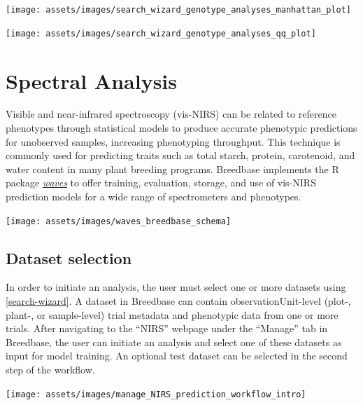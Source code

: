 \documentclass[
  12pt,
]{book}
\begin{document}
\begin{center}\texttt{[image: assets/images/search\_wizard\_genotype\_analyses\_manhattan\_plot]} \end{center}

\begin{center}\texttt{[image: assets/images/search\_wizard\_genotype\_analyses\_qq\_plot]} \end{center}

\hypertarget{spectral-analysis}{%
\section{Spectral Analysis}\label{spectral-analysis}}

Visible and near-infrared spectroscopy (vis-NIRS) can be related to reference phenotypes through statistical models to produce accurate phenotypic predictions for unobserved samples, increasing phenotyping throughput. This technique is commonly used for predicting traits such as total starch, protein, carotenoid, and water content in many plant breeding programs. Breedbase implements the R package \href{https://CRAN.R-project.org/package=waves}{\emph{waves}} to offer training, evaluation, storage, and use of vis-NIRS prediction models for a wide range of spectrometers and phenotypes.

\begin{center}\texttt{[image: assets/images/waves\_breedbase\_schema]} \end{center}

\hypertarget{dataset-selection}{%
\subsection{Dataset selection}\label{dataset-selection}}

In order to initiate an analysis, the user must select one or more datasets using \ref{search-wizard}. A dataset in Breedbase can contain observationUnit-level (plot-, plant-, or sample-level) trial metadata and phenotypic data from one or more trials. After navigating to the ``NIRS'' webpage under the ``Manage'' tab in Breedbase, the user can initiate an analysis and select one of these datasets as input for model training. An optional test dataset can be selected in the second step of the workflow.

\begin{center}\texttt{[image: assets/images/manage\_NIRS\_prediction\_workflow\_intro]} \end{center}
\end{document}
